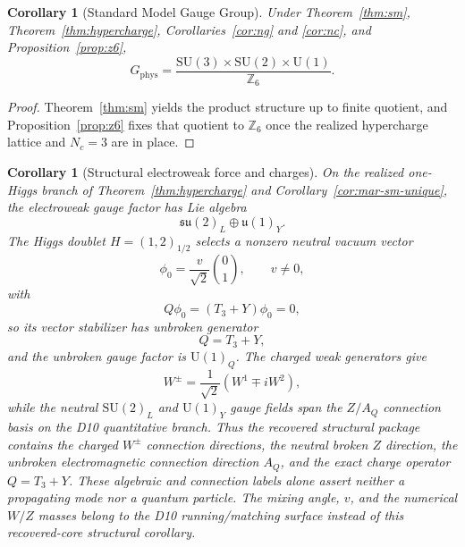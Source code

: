 \documentclass[11pt]{article}
\newtheorem{corollary}[theorem]{Corollary}
\newcommand{\SU}{\mathrm{SU}}
\newcommand{\U}{\mathrm{U}}
\begin{document}
\begin{corollary}[Standard Model Gauge Group]
Under Theorem~\ref{thm:sm}, Theorem~\ref{thm:hypercharge}, Corollaries~\ref{cor:ng} and \ref{cor:nc}, and Proposition~\ref{prop:z6},
\[
G_{\mathrm{phys}}=
\frac{\SU(3)\times\SU(2)\times\U(1)}{\mathbb Z_6}.
\]
\end{corollary}

\begin{proof}
Theorem~\ref{thm:sm} yields the product structure up to finite quotient, and Proposition~\ref{prop:z6} fixes that quotient to $\mathbb Z_6$ once the realized hypercharge lattice and $N_c=3$ are in place.
\end{proof}

\begin{corollary}[Structural electroweak force and charges]\label{cor:electroweak-force}
On the realized one-Higgs branch of Theorem~\ref{thm:hypercharge} and Corollary~\ref{cor:mar-sm-unique}, the electroweak gauge factor has Lie algebra
\[
\mathfrak{su}(2)_L\oplus\mathfrak{u}(1)_Y.
\]
The Higgs doublet \(H=(1,2)_{1/2}\) selects a nonzero neutral vacuum vector
\[
\phi_0=\frac{v}{\sqrt2}\binom{0}{1},\qquad v\ne0,
\]
with
\[
Q\phi_0=(T_3+Y)\phi_0=0,
\]
so its vector stabilizer has unbroken generator
\[
Q=T_3+Y,
\]
and the unbroken gauge factor is \(\U(1)_Q\). The charged weak generators give
\[
W^\pm=\frac{1}{\sqrt2}(W^1\mp iW^2),
\]
while the neutral \(\SU(2)_L\) and \(\U(1)_Y\) gauge fields span the \(Z/A_Q\) connection basis on the D10 quantitative branch. Thus the recovered structural package contains the charged \(W^\pm\) connection directions, the neutral broken \(Z\) direction, the unbroken electromagnetic connection direction \(A_Q\), and the exact charge operator \(Q=T_3+Y\). These algebraic and connection labels alone assert neither a propagating mode nor a quantum particle. The mixing angle, \(v\), and the numerical \(W/Z\) masses belong to the D10 running/matching surface instead of this recovered-core structural corollary.
\end{corollary}
\end{document}
